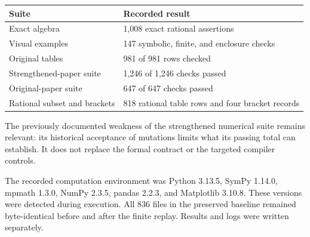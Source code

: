 \begin{longtable}{p{}p{}}
\toprule Suite & Recorded result \\ \midrule\endhead
Exact algebra & 1,008 exact rational assertions \\
Visual examples & 147 symbolic, finite, and enclosure checks \\
Original tables & 981 of 981 rows checked \\
Strengthened-paper suite & 1,246 of 1,246 checks passed \\
Original-paper suite & 647 of 647 checks passed \\
Rational subset and brackets & 818 rational table rows and four bracket records \\
\bottomrule
\end{longtable}
The previously documented weakness of the strengthened numerical suite remains relevant: its historical acceptance of mutations limits what its passing total can establish. It does not replace the formal contract or the targeted compiler controls.

The recorded computation environment was Python 3.13.5, SymPy 1.14.0, mpmath 1.3.0, NumPy 2.3.5, pandas 2.2.3, and Matplotlib 3.10.8. These versions were detected during execution. All 836 files in the preserved baseline remained byte-identical before and after the finite replay. Results and logs were written separately.

